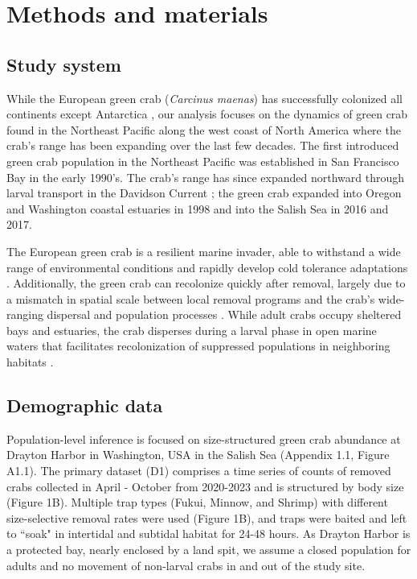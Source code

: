 \documentclass{article}
\begin{document}
\section{Methods and materials}

\subsection{Study system}

While the European green crab (\textit{Carcinus maenas}) has successfully colonized all continents except Antarctica \parencite{yamada2001global}, our analysis focuses on the dynamics of green crab found in the Northeast Pacific along the west coast of North America where the crab's range has been expanding over the last few decades. The first introduced green crab population in the Northeast Pacific was established in San Francisco Bay in the early 1990's. The crab's range has since expanded northward through larval transport in the Davidson Current \parencite{yamada2021ocean}; the green crab expanded into Oregon and Washington coastal estuaries in 1998 and into the Salish Sea in 2016 and 2017. 

The European green crab is a resilient marine invader, able to withstand a wide range of environmental conditions and rapidly develop cold tolerance adaptations \parencite{tepolt2020rapid}. Additionally, the green crab can recolonize quickly after removal, largely due to a mismatch in spatial scale between local removal programs and the crab’s wide-ranging dispersal and population processes \parencite{keller2025transition}. While adult crabs occupy sheltered bays and estuaries, the crab disperses during a larval phase in open marine waters that facilitates recolonization of suppressed populations in neighboring habitats \parencite{yamada2021ocean}.  

\subsection{Demographic data}

Population-level inference is focused on size-structured green crab abundance at Drayton Harbor in Washington, USA in the Salish Sea (Appendix 1.1, Figure A1.1). The primary dataset (D1) comprises a time series of counts of removed crabs collected in April - October from 2020-2023 and is structured by body size (Figure 1B). Multiple trap types (Fukui, Minnow, and Shrimp) with different size-selective removal rates were used (Figure 1B), and traps were baited and left to ``soak" in intertidal and subtidal habitat for 24-48 hours. As Drayton Harbor is a protected bay, nearly enclosed by a land spit, we assume a closed population for adults and no movement of non-larval crabs in and out of the study site. 
\end{document}
